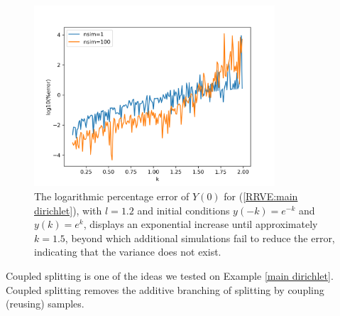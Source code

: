 \documentclass[a4paper,12pt]{article}
\begin{document}
\begin{figure}[h!]
  \centering
  \includegraphics[width=0.8\textwidth]{plots/mainD explosion.png}
  \caption{The logarithmic percentage error of $Y(0)$ for
  (\ref{RRVE:main dirichlet}), with $l=1.2$ and initial conditions
  $y(-k)=e^{-k}$ and $y(k)=e^{k}$, displays an exponential
  increase until approximately $k=1.5$, beyond which additional
  simulations fail to reduce the error, indicating that the variance
  does not exist.}
  \label{fig:mainD explosion}
\end{figure}

Coupled splitting is one of the ideas we tested on Example \ref{main dirichlet}.
Coupled splitting removes the additive branching of splitting by coupling (reusing)
samples.
\end{document}
